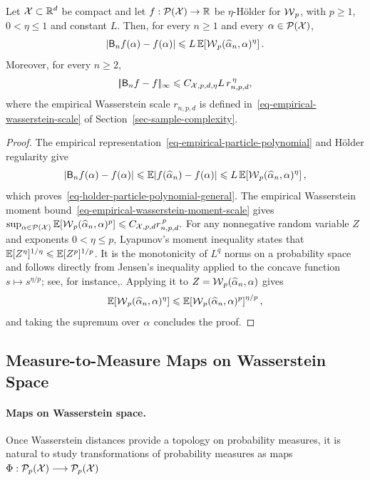 \begin{prop}\label{prop-holder-particle-polynomial}
Let \(\mathcal{X}\subset\mathbb{R}^d\) be compact and let \(f:\mathcal{P}(\mathcal{X})\to\mathbb{R}\) be \(\eta\)-H\"older for \(\operatorname{\mathcal{W}}_p\), with \(p\geq1\), \(0<\eta\leq1\) and constant \(L\). Then, for every $n\geq1$ and every \(\alpha\in\mathcal{P}(\mathcal{X})\),
\begin{equation}\label{eq-holder-particle-polynomial-general}
\left|\mathsf B_n f(\alpha)-f(\alpha)\right|
\leqslant
L\,\mathbb{E}\!\left[\operatorname{\mathcal{W}}_p(\widehat{\alpha}_n,\alpha)^\eta\right].
\end{equation}
Moreover, for every $n\geq2$,
\begin{equation}\label{eq-holder-particle-polynomial-rate}
|\!| \mathsf B_n f-f |\!|_{\infty}
\leqslant
C_{\mathcal{X},p,d,\eta}L\,r_{n,p,d}^{\,\eta},
\end{equation}
where the empirical Wasserstein scale \(r_{n,p,d}\) is defined in~\eqref{eq-empirical-wasserstein-scale} of Section~\ref{sec-sample-complexity}.
\end{prop}
\begin{proof}
The empirical representation~\eqref{eq-empirical-particle-polynomial} and H\"older regularity give
\[
|\mathsf B_n f(\alpha)-f(\alpha)|
\leqslant
\mathbb{E}|f(\widehat{\alpha}_n)-f(\alpha)|
\leqslant
L\,\mathbb{E}\!\left[\operatorname{\mathcal{W}}_p(\widehat{\alpha}_n,\alpha)^\eta\right],
\]
which proves~\eqref{eq-holder-particle-polynomial-general}. The empirical Wasserstein moment bound~\eqref{eq-empirical-wasserstein-moment-scale} gives
\(\sup_{\alpha\in\mathcal{P}(\mathcal{X})}\mathbb{E}[\operatorname{\mathcal{W}}_p(\widehat{\alpha}_n,\alpha)^p] \leqslant C_{\mathcal{X},p,d}r_{n,p,d}^{\,p}.\)
For any nonnegative random variable \(Z\) and exponents \(0<\eta\leq p\), Lyapunov's moment inequality states that
\(\mathbb{E}[Z^\eta]^{1/\eta}\leqslant\mathbb{E}[Z^p]^{1/p}\).
It is the monotonicity of \(L^q\) norms on a probability space and follows directly from Jensen's inequality applied to the concave function \(s\mapsto s^{\eta/p}\); see, for instance,. Applying it to \(Z=\operatorname{\mathcal{W}}_p(\widehat{\alpha}_n,\alpha)\) gives
\[
\mathbb{E}\!\left[\operatorname{\mathcal{W}}_p(\widehat{\alpha}_n,\alpha)^\eta\right]
\leqslant
\mathbb{E}\!\left[\operatorname{\mathcal{W}}_p(\widehat{\alpha}_n,\alpha)^p\right]^{\eta/p},
\]
and taking the supremum over \(\alpha\) concludes the proof.
\end{proof}
\subsection{Measure-to-Measure Maps on Wasserstein Space}\label{sec-measure-to-measure-maps}
\paragraph{Maps on Wasserstein space.}
Once Wasserstein distances provide a topology on probability measures, it is natural to study transformations of probability measures as maps
\(\Phi:\mathcal{P}_p(\mathcal{X})\longrightarrow \mathcal{P}_p(\mathcal{X})\)
